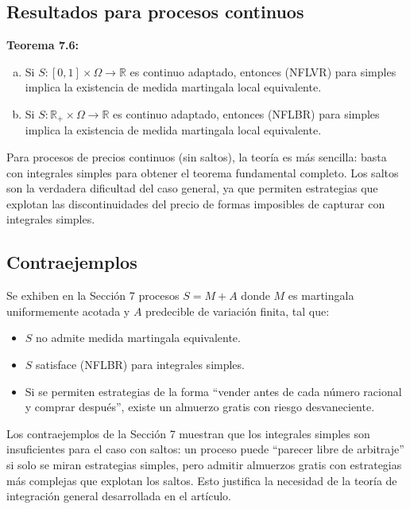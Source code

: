 \documentclass[12pt]{article}
\begin{document}
\subsection{Resultados para procesos continuos}

\textbf{Teorema 7.6:}
\begin{enumerate}[(a)]
    \item Si $S : [0,1] \times \Omega \to \mathbb{R}$ es continuo adaptado, entonces (NFLVR) para simples implica la existencia de medida martingala local equivalente.
    \item Si $S : \mathbb{R}_+ \times \Omega \to \mathbb{R}$ es continuo adaptado, entonces (NFLBR) para simples implica la existencia de medida martingala local equivalente.
\end{enumerate}

\begin{intuicion}
Para procesos de precios continuos (sin saltos), la teor\'ia es m\'as sencilla: basta con integrales simples para obtener el teorema fundamental completo. Los saltos son la verdadera dificultad del caso general, ya que permiten estrategias que explotan las discontinuidades del precio de formas imposibles de capturar con integrales simples.
\end{intuicion}

\subsection{Contraejemplos}

Se exhiben en la Secci\'on 7 procesos $S = M + A$ donde $M$ es martingala uniformemente acotada y $A$ predecible de variaci\'on finita, tal que:
\begin{itemize}
    \item $S$ no admite medida martingala equivalente.
    \item $S$ satisface (NFLBR) para integrales simples.
    \item Si se permiten estrategias de la forma ``vender antes de cada n\'umero racional y comprar despu\'es'', existe un almuerzo gratis con riesgo desvaneciente.
\end{itemize}

\begin{intuicion}
Los contraejemplos de la Secci\'on 7 muestran que los integrales simples son insuficientes para el caso con saltos: un proceso puede ``parecer libre de arbitraje'' si solo se miran estrategias simples, pero admitir almuerzos gratis con estrategias m\'as complejas que explotan los saltos. Esto justifica la necesidad de la teor\'ia de integraci\'on general desarrollada en el art\'iculo.
\end{intuicion}
\end{document}
